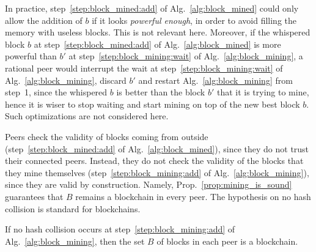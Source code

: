 %
In practice, step~\ref{step:block_mined:add} of Alg.~\ref{alg:block_mined} could
only allow the addition of $b$ if it looks \emph{powerful enough},
in order to avoid filling the memory with useless blocks. This is not relevant here.
Moreover, if the whispered block $b$
at step~\ref{step:block_mined:add} of Alg.~\ref{alg:block_mined} is more
powerful than $b'$ at step~\ref{step:block_mining:wait} of Alg.~\ref{alg:block_mining},
a rational peer would interrupt the wait at step~\ref{step:block_mining:wait}
of Alg.~\ref{alg:block_mining}, discard $b'$ and restart Alg.~\ref{alg:block_mining}
from step~1, since the whispered $b$ is better than the block $b'$ that it is trying to mine,
hence it is wiser to stop waiting and start mining on top of the new best block $b$.
Such optimizations are not considered here.

Peers check the validity of blocks coming from outside
(step~\ref{step:block_mined:add} of Alg.~\ref{alg:block_mined}), since they do not trust
their connected peers. Instead, they do not check the validity of the blocks that they
mine themselves (step~\ref{step:block_mining:add} of Alg.~\ref{alg:block_mining}),
since they are valid by construction. Namely,
Prop.~\ref{prop:mining_is_sound} guarantees that $B$ remains a blockchain in every peer.
The hypothesis on no hash collision is standard for blockchains.
%
\begin{proposition}\label{prop:mining_is_sound}
  If no hash collision occurs at step~\ref{step:block_mining:add} of Alg.~\ref{alg:block_mining},
  then the set $B$ of blocks in each peer is a blockchain.
\end{proposition}
